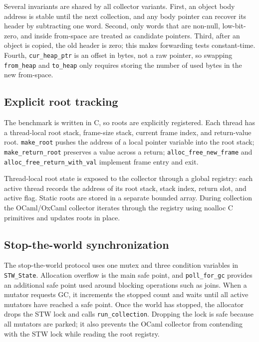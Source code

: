 \documentclass[11pt,a4paper]{article}
\begin{document}
Several invariants are shared by all collector variants.  First, an object body
address is stable until the next collection, and any body pointer can recover
its header by subtracting one word.  Second, only words that are non-null,
low-bit-zero, and inside from-space are treated as candidate pointers.  Third,
after an object is copied, the old header is zero; this makes forwarding tests
constant-time.  Fourth, \texttt{cur\_heap\_ptr} is an offset in bytes, not a
raw pointer, so swapping \texttt{from\_heap} and \texttt{to\_heap} only requires
storing the number of used bytes in the new from-space.

\subsection{Explicit root tracking}

The benchmark is written in C, so roots are explicitly registered.  Each thread
has a thread-local root stack, frame-size stack, current frame index, and
return-value root.  \texttt{make\_root} pushes the address of a local pointer
variable into the root stack; \texttt{make\_return\_root} preserves a value
across a return; \texttt{alloc\_free\_new\_frame} and
\texttt{alloc\_free\_return\_with\_val} implement frame entry and exit.

Thread-local root state is exposed to the collector through a global registry:
each active thread records the address of its root stack, stack index, return
slot, and active flag.  Static roots are stored in a separate bounded array.
During collection the OCaml/OxCaml collector iterates through the registry using
noalloc C primitives and updates roots in place.

\subsection{Stop-the-world synchronization}

The stop-the-world protocol uses one mutex and three condition variables in
\texttt{STW\_State}.  Allocation overflow is the main safe point, and
\texttt{poll\_for\_gc} provides an additional safe point used around blocking
operations such as joins.  When a mutator requests GC, it increments the stopped
count and waits until all active mutators have reached a safe point.  Once the
world has stopped, the allocator drops the STW lock and calls
\texttt{run\_collection}.  Dropping the lock is safe because all mutators are
parked; it also prevents the OCaml collector from contending with the STW lock
while reading the root registry.
\end{document}
